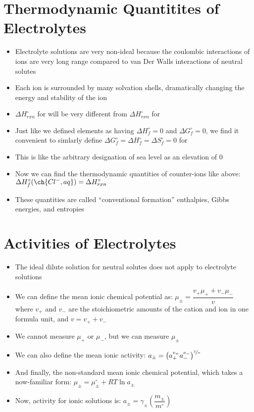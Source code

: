 \documentclass[12pt, openany, letterpaper]{memoir}
\begin{document}
\section*{Thermodynamic Quantitites of Electrolytes}
\begin{itemize}
	\item Electrolyte solutions are very non-ideal because the coulombic interactions of ions are very long range compared to van Der Walls interactions of neutral solutes
	\item Each ion is surrounded by many solvation shells, dramatically changing the energy and stability of the ion
	\item $\Delta H_{rxn}^\circ$ for  will be very different from $\Delta H_{rxn}^\circ$ for 
	\item Just like we defined elements as having $\Delta H^\circ_f = 0$ and $\Delta G^\circ_f =0$, we find it convenient to simlarly define $\Delta G^\circ_f = \Delta H^\circ_f = \Delta S^\circ_f = 0$ for 
	\item This is like the arbitrary designation of sea level as an elevation of $0$
	\item Now we can find the thermodynamic quantities of counter-ions like  above: $\Delta H^\circ_f(\ch{Cl^-, aq}) = \Delta H^\circ_{rxn}$
	\item These quantities are called ``conventional formation'' enthalpies, Gibbs energies, and entropies
\end{itemize}
\section*{Activities of Electrolytes}
\begin{itemize}
	\item The ideal dilute solution for neutral solutes does not apply to electrolyte solutions
	\item We can define the mean ionic chemical potential as: $\mu_\pm = \dfrac{v_+\mu_+ + v_-\mu_-}{v}$ where $v_+$ and $v_-$ are the stoichiometric amounts of the cation and ion in one formula unit, and $v=v_+ + v_-$
	\item We cannot measure $\mu_+$ or $\mu_-$, but we can measure $\mu_\pm$
	\item We can also define the mean ionic activity: $a_\pm = \left(a_+^{v_+}a_-^{v_-}\right)^{\nicefrac{1}{v}}$
	\item And finally, the non-standard mean ionic chemical potential, which takes a now-familiar form: $\mu_\pm = \mu^\circ_\pm + RT\ln a_\pm$
	\item Now, activity for ionic solutions is: $a_\pm = \gamma_\pm \left(\dfrac{m_\pm}{m^\circ}\right)$
\end{itemize}
\end{document}
